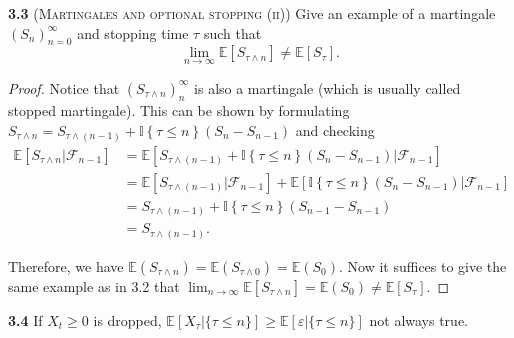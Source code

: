 \noindent\textbf{3.3}
(\textsc{Martingales and optional stopping (ii)}) Give an example of a martingale $\left(S_{n}\right)_{n=0}^{\infty}$ and
stopping time $\tau$ such that $$\lim _{n \rightarrow \infty} \mathbb{E}\left[S_{\tau \wedge n}\right] \neq \mathbb{E}\left[S_{\tau}\right].$$
\begin{proof}
    Notice that $(S_{\tau \wedge n})_n^\infty$ is also a martingale (which is usually called stopped martingale).
    This can be shown by formulating $S_{\tau \wedge n} = S_{\tau \wedge (n-1)} + \mathbb{I}\left\{\tau \leq n\right\} (S_n - S_{n-1})$ and checking
    \begin{equation*}
        \begin{aligned}
            \mathbb{E}[S_{\tau \wedge n} | \mathcal{F}_{n-1}]
            &= \mathbb{E}[S_{\tau \wedge (n-1)} + \mathbb{I}\left\{\tau \leq n\right\} (S_n - S_{n-1}) | \mathcal{F}_{n-1}]\\
            &= \mathbb{E}[S_{\tau \wedge (n-1)} | \mathcal{F}_{n-1}] + \mathbb{E}[\mathbb{I}\left\{\tau \leq n\right\} (S_n - S_{n-1}) | \mathcal{F}_{n-1}]\\
            &= S_{\tau \wedge (n-1)} + \mathbb{I}\left\{\tau \leq n\right\}(S_{n-1} - S_{n-1})\\
            &= S_{\tau \wedge (n-1)}.
        \end{aligned}
    \end{equation*}

    Therefore, we have $\mathbb{E}(S_{\tau \wedge n}) = \mathbb{E}(S_{\tau \wedge 0}) = \mathbb{E}(S_{0})$.
    Now it suffices to give the same example as in 3.2 that $\lim _{n \rightarrow \infty} \mathbb{E}\left[S_{\tau \wedge n}\right] = \mathbb{E}(S_{0}) \neq \mathbb{E}\left[S_{\tau}\right]$.
\end{proof}


\noindent\textbf{3.4} If $X_t\ge0$ is dropped, $\mathbb{E}[X_\tau|\{\tau\le n\}] \ge \mathbb{E}[\varepsilon|\{\tau\le n\}]$ not always true.




